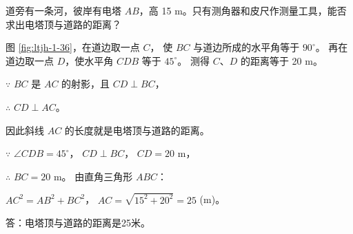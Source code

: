 \liti 道旁有一条河，彼岸有电塔 $AB$，高 15 m。只有测角器和皮尺作测量工具，能否求出电塔顶与道路的距离？

\jie 图 \ref{fig:ltjh-1-36}，在道边取一点 $C$， 使 $BC$ 与道边所成的水平角等于 $90^\circ$。
再在道边取一点 $D$，使水平角 $CDB$ 等于 $45^\circ$。
测得 $C$、$D$ 的距离等于 20 m。

$\because$ \quad $BC$ 是 $AC$ 的射影，且 $CD \perp BC$，

$\therefore$ \quad $CD \perp AC$。

因此斜线 $AC$ 的长度就是电塔顶与道路的距离。

$\because$ \quad $\angle CDB = 45^\circ$， $CD \perp BC$， $CD = 20$ m，

$\therefore$ \quad $BC = 20$ m。 由直角三角形 $ABC$：

\qquad $AC^2 = AB^2 + BC^2$， $AC = \sqrt{15^2 + 20^2} = 25$ (m)。

答：电塔顶与道路的距离是25米。


\begin{lianxi}



\end{lianxi}

